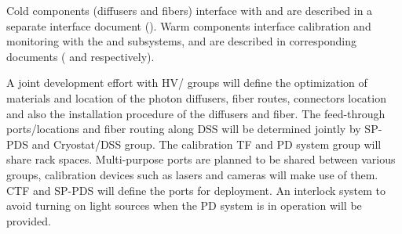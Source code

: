 Cold components (diffusers and fibers) interface with  and are described in a separate interface document (). Warm components interface calibration and monitoring  with the  and  subsystems, and are described in corresponding documents ( and  respectively).


A joint development effort with HV/ groups will define the optimization of materials and location of the photon diffusers, fiber routes, connectors location and also the installation procedure of the diffusers and fiber. The feed-through ports/locations and fiber routing along DSS will be determined jointly by SP-PDS and Cryostat/DSS group. The calibration TF and PD system group will share rack spaces. Multi-purpose ports are planned to be shared between various groups, calibration devices such as lasers and cameras will make use of them. CTF and SP-PDS will define the ports for deployment. An interlock system to avoid turning on light sources when the PD system is in operation will be provided.







